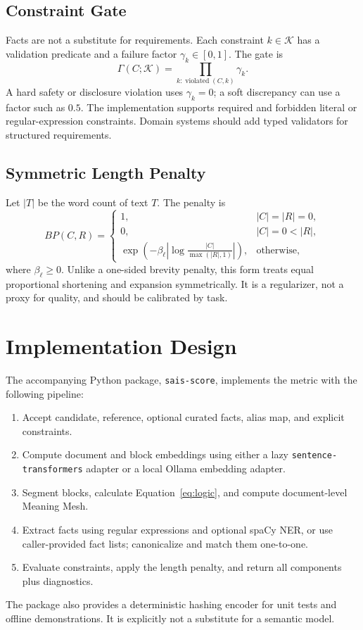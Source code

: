 \documentclass[11pt]{article}
\begin{document}
\subsection{Constraint Gate}

Facts are not a substitute for requirements. Each constraint $k\in\mathcal K$
has a validation predicate and a failure factor $\gamma_k\in[0,1]$. The gate is
\begin{equation}
\Gamma(C;\mathcal K)=\prod_{k:\operatorname{violated}(C,k)}\gamma_k.
\end{equation}
A hard safety or disclosure violation uses $\gamma_k=0$; a soft discrepancy
can use a factor such as $0.5$. The implementation supports required and
forbidden literal or regular-expression constraints. Domain systems should add
typed validators for structured requirements.

\subsection{Symmetric Length Penalty}

Let $|T|$ be the word count of text $T$. The penalty is
\begin{equation}
BP(C,R)=
\begin{cases}
1, & |C|=|R|=0,\\
0, & |C|=0<|R|,\\
\exp\left(-\beta_\ell\left|\log
\frac{|C|}{\max(|R|,1)}\right|\right), & \text{otherwise},
\end{cases}
\end{equation}
where $\beta_\ell\geq0$. Unlike a one-sided brevity penalty, this form treats
equal proportional shortening and expansion symmetrically. It is a regularizer,
not a proxy for quality, and should be calibrated by task.

\section{Implementation Design}

The accompanying Python package, \texttt{sais-score}, implements the metric
with the following pipeline:
\begin{enumerate}
  \item Accept candidate, reference, optional curated facts, alias map, and
  explicit constraints.
  \item Compute document and block embeddings using either a lazy
  \texttt{sentence-transformers} adapter or a local Ollama embedding adapter.
  \item Segment blocks, calculate Equation~\ref{eq:logic}, and compute
  document-level Meaning Mesh.
  \item Extract facts using regular expressions and optional spaCy NER, or use
  caller-provided fact lists; canonicalize and match them one-to-one.
  \item Evaluate constraints, apply the length penalty, and return all
  components plus diagnostics.
\end{enumerate}
The package also provides a deterministic hashing encoder for unit tests and
offline demonstrations. It is explicitly not a substitute for a semantic model.
\end{document}
